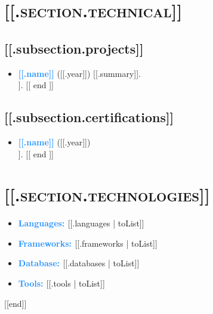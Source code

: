 \documentclass[10pt,a4paper,sans]{moderncv}        %
\begin{document}
\section{\textsc{[[.section.technical]]}}
\vspace{-2pt}
\subsection{[[.subsection.projects]]}
\vspace{3pt}
\begin{itemize}
  [[ range .projects ]]
  \item{\textbf{\textcolor{dodgerblue}{[[.name]]}} \textcolor{dartmouthgreen}{([[.year]])} [[.summary]]}.
        \\ [[.description]].
        [[ end ]]
\end{itemize}

\subsection{[[.subsection.certifications]]}
\vspace{3pt}
\begin{itemize}
  [[ range .certifications ]]
  \item{\textbf{\textcolor{dodgerblue}{[[.name]]}} \textcolor{dartmouthgreen}{([[.year]])}}\\[[.description]].
        [[ end ]]
\end{itemize}

\section{\textsc{[[.section.technologies]]}}
\begin{itemize}[[with .technologies]]
  \item \textbf{\textcolor{dodgerblue}{Languages: }} [[.languages | toList]]
  \item \textbf{\textcolor{dodgerblue}{Frameworks: }} [[.frameworks | toList]]
  \item \textbf{\textcolor{dodgerblue}{Database: }} [[.databases | toList]]
  \item \textbf{\textcolor{dodgerblue}{Tools: }} [[.tools | toList]]
\end{itemize}[[end]]
\end{document}
